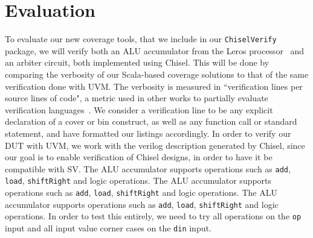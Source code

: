 \documentclass[conference]{IEEEtran}
\newcommand{\todo}[1]{{\color{olive} TODO: #1}}
\newcommand{\martin}[1]{{\color{blue} Martin: #1}}
\newcommand{\hjd}[1]{{\color{pink} Hans: #1}}
\begin{document}
\section{Evaluation}
To evaluate our new coverage tools, that we include in our \texttt{ChiselVerify} package, we will verify both an ALU accumulator from the Leros processor~\cite{leros:arcs2019} and an arbiter circuit, both implemented using Chisel. 
This will be done by comparing the verbosity of our Scala-based coverage solutions to that of the same verification done with UVM. 
The verbosity is measured in ``verification lines per source lines of code", a metric used in other works to partially evaluate verification languages~\cite{Nagini:2018, MuellerSchwerhoffSummers16}.
We consider a verification line to be any explicit declaration of a cover or bin construct, as well as any function call or standard statement, and have formatted our listings accordingly. 
In order to verify our DUT with UVM, we work with the verilog description generated by Chisel, since our goal is to enable verification of Chisel designs, in order to have it be compatible with SV.
The ALU accumulator supports operations such as \texttt{add}, \texttt{load}, \texttt{shiftRight} and logic operations. %
 The ALU accumulator supports operations such as \texttt{add}, \texttt{load}, \texttt{shiftRight} and logic operations. %
The ALU accumulator supports operations such as \texttt{add}, \texttt{load}, \texttt{shiftRight} and logic operations. %
In order to test this entirely, we need to try all operations on the \texttt{op} input and all input value corner cases on the \texttt{din} input. %
\end{document}
